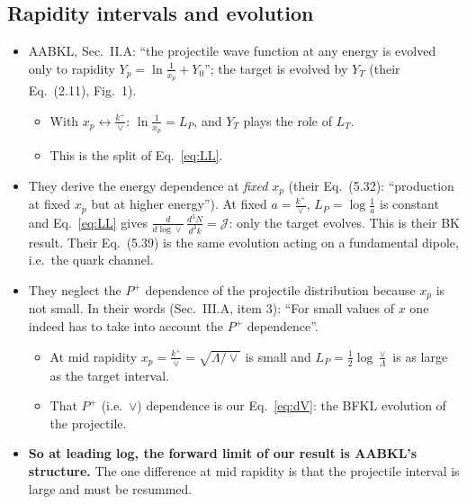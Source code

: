 \documentclass[11pt]{article}
\numberwithin{equation}{section}
\newcommand{\JJ}{\mathcal J}
\newcommand{\LT}{L_T}
\newcommand{\LP}{L_P}
\begin{document}
\subsection{Rapidity intervals and evolution}
\begin{itemize}
\item AABKL, Sec.~II.A: ``the projectile wave function at any energy is evolved only to rapidity $Y_p=\ln\frac{1}{x_p}+Y_0$''; the target is evolved by $Y_T$ (their Eq.~(2.11), Fig.~1).
\begin{itemize}
\item With $x_p\leftrightarrow\frac{k^+}{\vee}$: $\ln\frac1{x_p}=\LP$, and $Y_T$ plays the role of $\LT$.
\item This is the split of Eq.~\eqref{eq:LL}.
\end{itemize}
\item They derive the energy dependence at \emph{fixed} $x_p$ (their Eq.~(5.32): ``production at fixed $x_p$ but at higher energy''). At fixed $a=\frac{k^+}{\vee}$, $\LP=\log\frac1a$ is constant and Eq.~\eqref{eq:LL} gives $\frac{d}{d\log\vee}\,\frac{d^3N}{d^3k}=\JJ$: only the target evolves. This is their BK result. Their Eq.~(5.39) is the same evolution acting on a fundamental dipole, i.e.\ the quark channel.
\item They neglect the $P^+$ dependence of the projectile distribution because $x_p$ is not small. In their words (Sec.~III.A, item 3): ``For small values of $x$ one indeed has to take into account the $P^+$ dependence''.
\begin{itemize}
\item At mid rapidity $x_p=\frac{k^+}{\vee}=\sqrt{\Lambda/\vee}$ is small and $\LP=\frac12\log\frac\vee\Lambda$ is as large as the target interval.
\item That $P^+$ (i.e.\ $\vee$) dependence is our Eq.~\eqref{eq:dV}: the BFKL evolution of the projectile.
\end{itemize}
\item \textbf{So at leading log, the forward limit of our result is AABKL's structure.} The one difference at mid rapidity is that the projectile interval is large and must be resummed.
\end{itemize}
\end{document}
